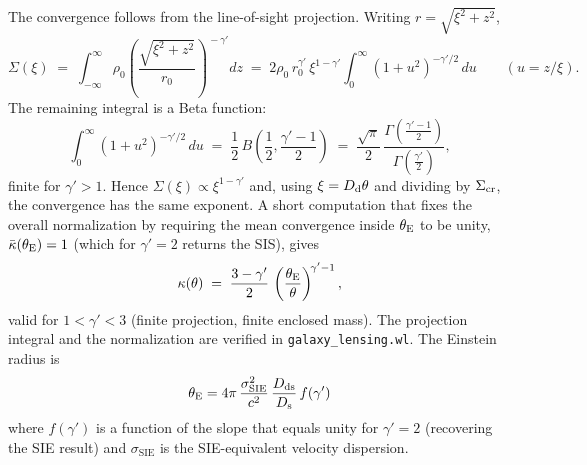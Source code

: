 The convergence follows from the line-of-sight projection.  Writing
$r = \sqrt{\xi^2 + z^2}$,
\begin{equation*}
    \Sigma(\xi) \;=\; \int_{-\infty}^{\infty}\!
        \rho_0\!\left(\frac{\sqrt{\xi^2+z^2}}{r_0}\right)^{\!-\gamma'}\!\!dz
    \;=\; 2\rho_0\,r_0^{\gamma'}\,\xi^{1-\gamma'}\!
        \int_0^{\infty}\!(1+u^2)^{-\gamma'/2}\,du
    \qquad (u = z/\xi).
\end{equation*}
The remaining integral is a Beta function:
\begin{equation*}
    \int_0^{\infty}(1 + u^2)^{-\gamma'/2}\,du
    \;=\; \frac{1}{2}\,B\!\left(\frac{1}{2},\frac{\gamma'-1}{2}\right)
    \;=\; \frac{\sqrt{\pi}}{2}\,
        \frac{\Gamma\!\left(\frac{\gamma'-1}{2}\right)}{\Gamma\!\left(\frac{\gamma'}{2}\right)},
\end{equation*}
finite for $\gamma' > 1$.  Hence $\Sigma(\xi) \propto \xi^{1-\gamma'}$
and, using $\xi = D_{\mathrm{d}}\theta$ and dividing by $\Sigma_{\mathrm{cr}}$, the
convergence has the same exponent.  A short computation that fixes
the overall normalization by requiring the mean convergence inside
$\theta_{\mathrm{E}}$ to be unity, $\bar{\kappa}(\theta_{\mathrm{E}}) = 1$ (which for
$\gamma' = 2$ returns the SIS), gives
\begin{equation}
    \kappa(\theta) \;=\; \frac{3 - \gamma'}{2}\,
        \left(\frac{\theta_{\mathrm{E}}}{\theta}\right)^{\!\gamma' - 1},
    \label{eq:kappa_power_law}
\end{equation}
valid for $1 < \gamma' < 3$ (finite projection, finite enclosed
mass).  The projection integral and the normalization are verified
in \texttt{galaxy\_lensing.wl}.  The Einstein radius is
\begin{equation}
    \theta_{\mathrm{E}} = 4\pi\,\frac{\sigma_{\mathrm{SIE}}^2}{c^2}
    \,\frac{D_{\mathrm{ds}}}{D_{\mathrm{s}}}\,f(\gamma')
    \label{eq:thetaE_power_law}
\end{equation}
where $f(\gamma')$ is a function of the slope that equals unity for
$\gamma' = 2$ (recovering the SIE result) and $\sigma_{\mathrm{SIE}}$
is the SIE-equivalent velocity dispersion.

